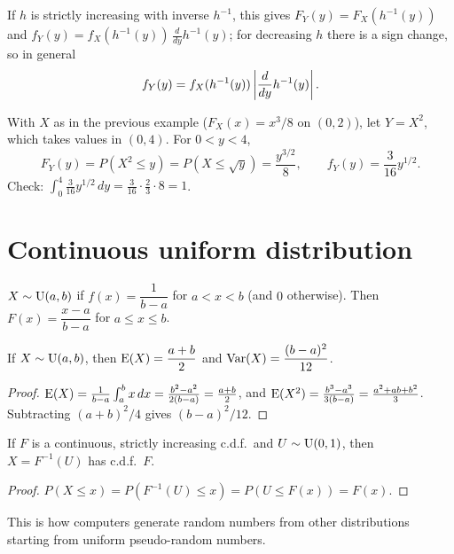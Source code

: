 If $h$ is strictly increasing with inverse $h^{-1}$, this gives
$F_Y(y) = F_X(h^{-1}(y))$ and $f_Y(y) = f_X(h^{-1}(y))\,\frac{d}{dy}h^{-1}(y)$; for
decreasing $h$ there is a sign change, so in general
\[
  f_Y(y) = f_X(h^{-1}(y))\left\lvert \frac{d}{dy}h^{-1}(y) \right\rvert.
\]

\begin{example}
With $X$ as in the previous example ($F_X(x) = x^3/8$ on $(0,2)$), let $Y = X^2$, which
takes values in $(0,4)$. For $0<y<4$,
\[
  F_Y(y) = P(X^2 \le y) = P(X\le\sqrt y) = \frac{y^{3/2}}{8}, \qquad
  f_Y(y) = \frac{3}{16}y^{1/2}.
\]
Check: $\int_0^4 \frac3{16}y^{1/2}\,dy = \frac{3}{16}\cdot\frac23\cdot 8 = 1$.
\end{example}

\section{Continuous uniform distribution}

\begin{definition}[Uniform]
$X\sim\operatorname{U}(a,b)$ if $f(x) = \dfrac{1}{b-a}$ for $a<x<b$ (and $0$ otherwise). Then
$F(x) = \dfrac{x-a}{b-a}$ for $a\le x\le b$.
\end{definition}

\begin{theorem}
If $X\sim\operatorname{U}(a,b)$, then $\operatorname{E}(X) = \dfrac{a+b}2$ and $\operatorname{Var}(X) = \dfrac{(b-a)^2}{12}$.
\end{theorem}

\begin{proof}
$\operatorname{E}(X) = \frac{1}{b-a}\int_a^b x\,dx = \frac{b^2-a^2}{2(b-a)} = \frac{a+b}{2}$, and
$\operatorname{E}(X^2) = \frac{b^3-a^3}{3(b-a)} = \frac{a^2+ab+b^2}{3}$. Subtracting $(a+b)^2/4$ gives
$(b-a)^2/12$.
\end{proof}

\begin{theorem}
If $F$ is a continuous, strictly increasing c.d.f.\ and $U\sim\operatorname{U}(0,1)$, then
$X = F^{-1}(U)$ has c.d.f.\ $F$.
\end{theorem}

\begin{proof}
$P(X\le x) = P(F^{-1}(U)\le x) = P(U\le F(x)) = F(x)$.
\end{proof}

This is how computers generate random numbers from other distributions starting from
uniform pseudo-random numbers.


